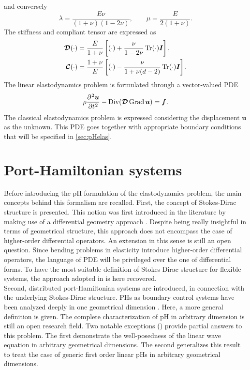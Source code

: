 and conversely
\begin{equation}
\lambda =\frac {E \nu }{(1+\nu )(1-2\nu )}, \qquad
\mu = \frac{E}{2(1+\nu)}.
\end{equation}
The stiffness and compliant tensor are expressed as
\begin{align}
	\bm{\mathcal{D}}(\cdot) &= \frac{E}{1+\nu} \left[(\cdot) + \frac{\nu}{1-2\nu}\Tr(\cdot)\bm{I}\right], \label{eq:stiff3D} \vspace{3pt}\\
	\bm{\mathcal{C}}(\cdot) &= \frac{1+\nu}{E}\left[(\cdot) - \frac{\nu}{1+\nu(d-2)}\Tr(\cdot)\bm{I}\right].
\end{align}
The linear elastodynamics problem is formulated through a vector-valued PDE
\begin{equation}\label{eq:lin_elastodyn}
\rho \diffp[2]{\bm{u}}{t} - \Div(\bm{\mathcal{D}} \Grad \bm{u}) = \bm{f}.
\end{equation}  
The classical elastodynamics problem is expressed considering the displacement $\bm{u}$ as the unknown. This PDE goes together with appropriate boundary conditions that will be specified in \ref{sec:pHelas}.

\section{Port-Hamiltonian systems}

Before introducing the pH formulation of the elastodynamics problem, the main concepts behind this formalism are recalled. First, the concept of Stokes-Dirac structure is presented. This notion was first introduced in the literature by making use of a differential geometry approach \cite{vanderschaft2002}. Despite being really insightful in terms of geometrical structure, this approach does not encompass the case of higher-order differential operators. An extension in this sense is still an open question. Since bending problems in elasticity introduce higher-order differential operators, the language of PDE will be privileged over the one of differential forms. To have the most suitable definition of Stokes-Dirac structure for flexible systems, the approach adopted in \cite{macchelli2004modelling} is here recovered. \\

Second, distributed port-Hamiltonian systems are introduced, in connection with the underlying Stokes-Dirac structure. PHs as boundary control systems have been analyzed deeply in one geometrical dimension \cite{zwart2012,legorrec2005}. Here, a more general definition is given. The complete characterization of pH in arbitrary dimension is still an open research field. Two notable exceptions (\cite{zwart2015wave,skrepek2019wellposedness}) provide partial answers to this problem. The first demonstrate the well-posedness of the linear wave equation in arbitrary geometrical dimensions. The second generalizes this result to treat the case of generic first order linear pHs in arbitrary geometrical dimensions.

